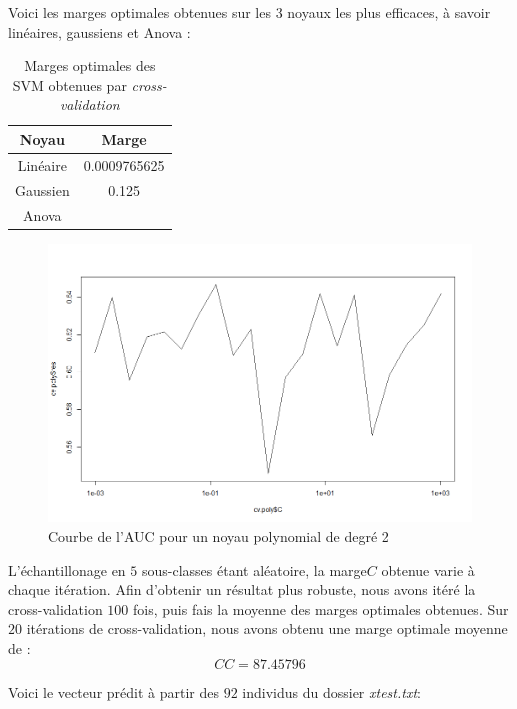 \documentclass{article}
\begin{document}
Voici les marges optimales obtenues sur les 3 noyaux les plus efficaces, à savoir linéaires, gaussiens et Anova :
\begin{table}[!ht]
\center
\begin{tabular}{|c|c|}
\hline
\textbf{Noyau} & \textbf{Marge}\\
\hline
Linéaire & 0.0009765625\\
\hline
Gaussien & 0.125 \\
\hline
Anova & \\
\hline
\end{tabular}
\caption{Marges optimales des SVM obtenues par \textit{cross-validation}}
\label{Margin}
\end{table}

\begin{figure}[!h]\centering
\includegraphics[scale=0.4]{auc.png}
\caption{Courbe de l'AUC pour un noyau polynomial de degré 2}
\label{fig:AUC Poly}
\end{figure}

L'échantillonage en $5$ sous-classes étant aléatoire, la marge$C$ obtenue varie à chaque itération. Afin d'obtenir un résultat plus robuste, nous avons itéré la cross-validation $100$ fois, puis fais la moyenne des marges optimales obtenues. Sur $20$ itérations de cross-validation, nous avons obtenu une marge optimale moyenne de :
\[CC=87.45796\]

Voici le vecteur prédit à partir des $92$ individus du dossier \textit{xtest.txt}:\\

\\
\\
\end{document}

